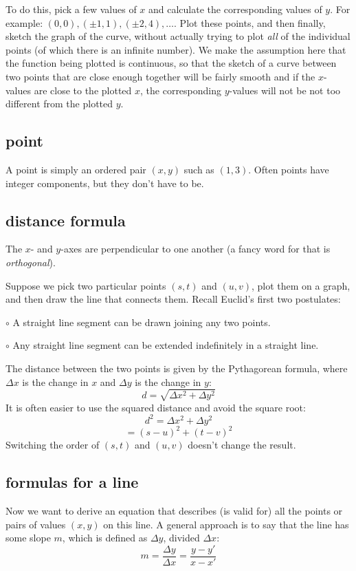 \documentclass[11pt, oneside]{article}
\begin{document}
To do this, pick a few values of $x$ and calculate the corresponding values of $y$.  For example:  $(0,0), (\pm 1,1), (\pm 2, 4), \dots$.  Plot these points, and then finally, sketch the graph of the curve, without actually trying to plot \emph{all} of the individual points (of which there is an infinite number).  We make the assumption here that the function being plotted is continuous, so that the sketch of a curve between two points that are close enough together will be fairly smooth and if the $x$-values are close to the plotted $x$, the corresponding $y$-values will not be not too different from the plotted $y$.

\subsection*{point}
A point is simply an ordered pair $(x,y)$ such as $(1,3)$.  Often points have integer components, but they don't have to be.

\subsection*{distance formula}
The $x$- and $y$-axes are perpendicular to one another (a fancy word for that is \emph{orthogonal}).  

Suppose we pick two particular points $(s,t)$ and $(u,v)$, plot them on a graph, and then draw the line that connects them.  Recall Euclid's first two postulates:

$\circ$  A straight line segment can be drawn joining any two points.

$\circ$   Any straight line segment can be extended indefinitely in a straight line.

The distance between the two points is given by the Pythagorean formula, where $\Delta x$ is the change in $x$ and $\Delta y$ is the change in $y$:
\[ d = \sqrt{\Delta x^2 + \Delta y^2} \]
It is often easier to use the squared distance and avoid the square root:
\[ d^2 = \Delta x^2 + \Delta y^2 \]
\[ = (s-u)^2 + (t-v)^2 \]
Switching the order of $(s,t)$ and $(u,v)$ doesn't change the result.

\subsection*{formulas for a line}
 
Now we want to derive an equation that describes (is valid for) all the points or pairs of values $(x,y)$ on this line.  A general approach is to say that the line has some slope $m$, which is defined as $\Delta y$, divided $\Delta x$:
\[ m = \frac{\Delta y}{\Delta x} = \frac{y-y'}{x-x'} \]
\end{document}
